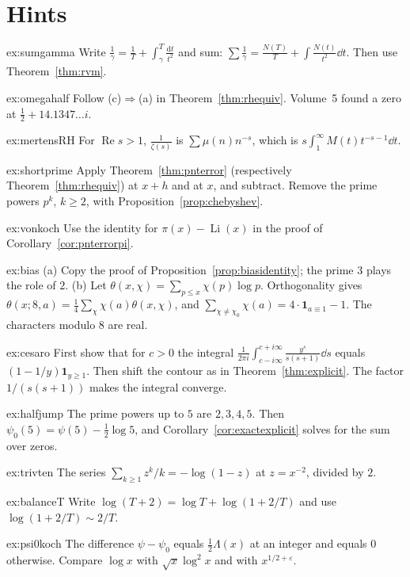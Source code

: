 \section{Hints}

\begin{hint}{ex:sumgamma}
Write $\frac1\gamma=\frac1T+\int_\gamma^T\frac{\mathrm dt}{t^2}$ and sum: $\sum\frac1\gamma=\frac{N(T)}T+\int\frac{N(t)}{t^2}\dd t$. Then use Theorem~\ref{thm:rvm}.
\end{hint}
\begin{hint}{ex:omegahalf}
Follow (c)$\Rightarrow$(a) in Theorem~\ref{thm:rhequiv}. Volume~5 found a zero at $\frac12+14.1347\ldots i$.
\end{hint}
\begin{hint}{ex:mertensRH}
For $\operatorname{Re}s>1$, $\frac1{\zeta(s)}$ is $\sum\mu(n)n^{-s}$, which is $s\int_1^\infty M(t)t^{-s-1}\dd t$.
\end{hint}
\begin{hint}{ex:shortprime}
Apply Theorem~\ref{thm:pnterror} (respectively Theorem~\ref{thm:rhequiv}) at $x+h$ and at $x$, and subtract. Remove the prime powers $p^k$, $k\ge2$, with Proposition~\ref{prop:chebyshev}.
\end{hint}
\begin{hint}{ex:vonkoch}
Use the identity for $\pi(x)-\operatorname{Li}(x)$ in the proof of Corollary~\ref{cor:pnterrorpi}.
\end{hint}
\begin{hint}{ex:bias}
(a) Copy the proof of Proposition~\ref{prop:biasidentity}; the prime $3$ plays the role of $2$. (b) Let $\theta(x,\chi)=\sum_{p\le x}\chi(p)\log p$. Orthogonality gives $\theta(x;8,a)=\frac14\sum_\chi\chi(a)\theta(x,\chi)$, and $\sum_{\chi\ne\chi_0}\chi(a)=4\cdot\mathbf1_{a\equiv1}-1$. The characters modulo $8$ are real.
\end{hint}
\begin{hint}{ex:cesaro}
First show that for $c>0$ the integral $\frac1{2\pi i}\int_{c-i\infty}^{c+i\infty}\frac{y^s}{s(s+1)}\dd s$ equals $(1-1/y)\mathbf1_{y\ge1}$. Then shift the contour as in Theorem~\ref{thm:explicit}. The factor $1/(s(s+1))$ makes the integral converge.
\end{hint}
\begin{hint}{ex:halfjump}
The prime powers up to $5$ are $2,3,4,5$. Then $\psi_0(5)=\psi(5)-\frac12\log5$, and Corollary~\ref{cor:exactexplicit} solves for the sum over zeros.
\end{hint}
\begin{hint}{ex:trivten}
The series $\sum_{k\ge1}z^k/k=-\log(1-z)$ at $z=x^{-2}$, divided by $2$.
\end{hint}
\begin{hint}{ex:balanceT}
Write $\log(T+2)=\log T+\log(1+2/T)$ and use $\log(1+2/T)\sim2/T$.
\end{hint}
\begin{hint}{ex:psi0koch}
The difference $\psi-\psi_0$ equals $\frac12\Lambda(x)$ at an integer and equals $0$ otherwise. Compare $\log x$ with $\sqrt x\log^2x$ and with $x^{1/2+\varepsilon}$.
\end{hint}

